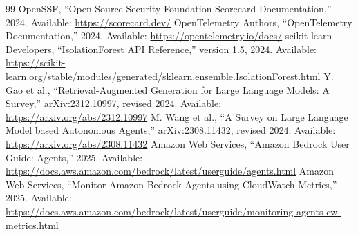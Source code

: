 \documentclass[12pt,oneside]{report}
\begin{document}
\begin{thebibliography}{99}
 OpenSSF, ``Open Source Security Foundation Scorecard Documentation,'' 2024. Available: \url{https://scorecard.dev/}
 OpenTelemetry Authors, ``OpenTelemetry Documentation,'' 2024. Available: \url{https://opentelemetry.io/docs/}
 scikit-learn Developers, ``IsolationForest API Reference,'' version 1.5, 2024. Available: \url{https://scikit-learn.org/stable/modules/generated/sklearn.ensemble.IsolationForest.html}
 Y. Gao et al., ``Retrieval-Augmented Generation for Large Language Models: A Survey,'' arXiv:2312.10997, revised 2024. Available: \url{https://arxiv.org/abs/2312.10997}
 M. Wang et al., ``A Survey on Large Language Model based Autonomous Agents,'' arXiv:2308.11432, revised 2024. Available: \url{https://arxiv.org/abs/2308.11432}
 Amazon Web Services, ``Amazon Bedrock User Guide: Agents,'' 2025. Available: \url{https://docs.aws.amazon.com/bedrock/latest/userguide/agents.html}
 Amazon Web Services, ``Monitor Amazon Bedrock Agents using CloudWatch Metrics,'' 2025. Available: \url{https://docs.aws.amazon.com/bedrock/latest/userguide/monitoring-agents-cw-metrics.html}
\end{thebibliography}
\end{document}
